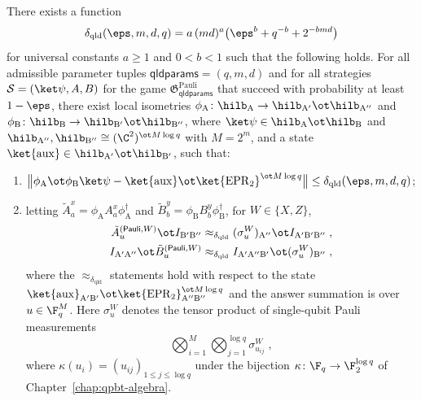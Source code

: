 \begin{corollary}\label{cor:pauli-binary}
	\leanok
	There exists a function
	\[
		\delta_{\mathrm{qld}}(\eps, m, d, q) = a\,(md)^a \bigl( \eps^b + q^{-b} + 2^{-bmd} \bigr)
	\]
	for universal constants $a \ge 1$ and $0 < b < 1$ such that the following holds. For all admissible parameter tuples $\mathsf{qldparams} = (q,m,d)$ and for all strategies $\mathcal S = (\ket\psi, A, B)$ for the game $\mathfrak{G}^{\mathrm{Pauli}}_{\mathsf{qldparams}}$ that succeed with probability at least $1 - \eps$, there exist local isometries $\phi_{\mathrm A}\colon \hilb_{\mathrm A} \to \hilb_{\mathrm A'} \ot \hilb_{\mathrm A''}$ and $\phi_{\mathrm B}\colon \hilb_{\mathrm B} \to \hilb_{\mathrm B'} \ot \hilb_{\mathrm B''}$, where $\ket\psi \in \hilb_{\mathrm A} \ot \hilb_{\mathrm B}$ and $\hilb_{\mathrm A''}, \hilb_{\mathrm B''} \cong (\C^2)^{\ot M \log q}$ with $M = 2^m$, and a state $\ket{\mathrm{aux}} \in \hilb_{\mathrm A'} \ot \hilb_{\mathrm B'}$, such that:
	\begin{enumerate}
		\item $\bigl\| \phi_{\mathrm A} \ot \phi_{\mathrm B} \ket\psi - \ket{\mathrm{aux}} \ot \ket{\mathrm{EPR}_2}^{\ot M \log q} \bigr\| \le \delta_{\mathrm{qld}}(\eps, m, d, q)$;
		\item letting $\tilde A^x_a = \phi_{\mathrm A} A^x_a \phi_{\mathrm A}^\dagger$ and $\tilde B^y_b = \phi_{\mathrm B} B^y_b \phi_{\mathrm B}^\dagger$, for $W \in \{X, Z\}$,
		\begin{align*}
			\tilde A^{(\mathsf{Pauli},W)}_u \ot I_{\mathrm{B'B''}} &\approx_{\delta_{\mathrm{qld}}} (\sigma^W_u)_{\mathrm A''} \ot I_{\mathrm{A'B'B''}}\;,\\
			I_{\mathrm{A'A''}} \ot \tilde B^{(\mathsf{Pauli},W)}_u &\approx_{\delta_{\mathrm{qld}}} I_{\mathrm{A'A''B'}} \ot (\sigma^W_u)_{\mathrm B''}\;,
		\end{align*}
		where the $\approx_{\delta_{\mathrm{qld}}}$ statements hold with respect to the state $\ket{\mathrm{aux}}_{\mathrm{A'B'}} \ot \ket{\mathrm{EPR}_2}^{\ot M \log q}_{\mathrm{A''B''}}$ and the answer summation is over $u \in \F_q^M$. Here $\sigma^W_u$ denotes the tensor product of single-qubit Pauli measurements
		\[
			\bigotimes_{i=1}^{M} \bigotimes_{j=1}^{\log q} \sigma^W_{u_{ij}}\;,
		\]
		where $\kappa(u_i) = (u_{ij})_{1 \le j \le \log q}$ under the bijection $\kappa\colon \F_q \to \F_2^{\log q}$ of Chapter~\ref{chap:qpbt-algebra}.
	\end{enumerate}
\end{corollary}
